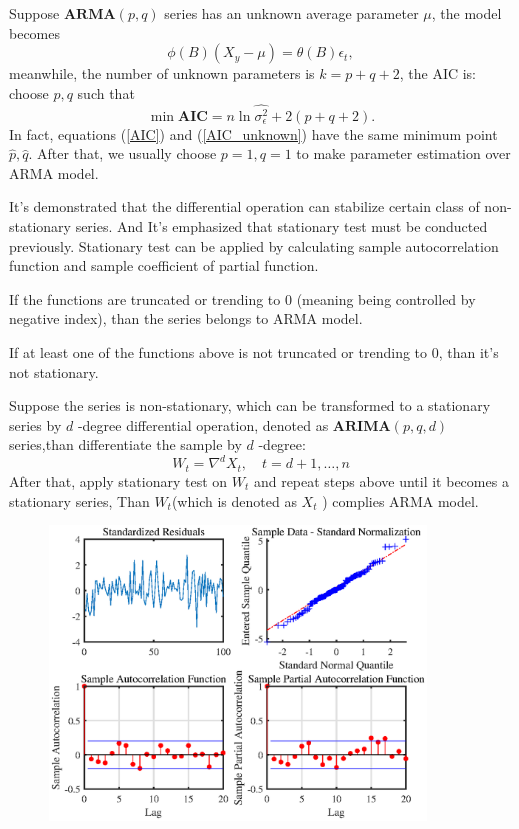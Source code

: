 \documentclass{mcmthesis}
\numberwithin{figure}{section}
\numberwithin{table}{section}
\numberwithin{equation}{section}
\begin{document}
\par
Suppose $ \mathbf{ARMA}(p,q) $ series has an unknown average parameter $ \mu $,
the model becomes
$$
  \phi(B)(X_y-\mu) = \theta(B)\epsilon_t,
$$   
meanwhile, the number of unknown parameters is $ k = p+q+2 $, the AIC is:
choose $ p,q $ such that
\begin{equation}\label{AIC_unknown}
  \min \mathbf{AIC} = n\ln\hat{\sigma_\epsilon^2}+2(p+q+2).
\end{equation}  
In fact, equations (\ref{AIC}) and (\ref{AIC_unknown}) have the same minimum point $ \hat{p},\hat{q} $.
After that, we usually choose $ p = 1, q = 1 $ to make parameter estimation 
over ARMA model.
\par
It's demonstrated that the differential operation can stabilize 
certain class of non-stationary series. And It's emphasized that 
stationary test must be conducted previously. Stationary test can 
be applied by calculating sample autocorrelation function and 
sample coefficient of partial function. 
\par
If the functions are truncated or trending to 0 (meaning being controlled
by negative index), than the series belongs to ARMA model.
\par
If at least one of the functions above is not truncated or trending to 0, than
it's not stationary.
\par
Suppose the series is non-stationary, which can be transformed to 
a stationary series by $ d $ -degree differential operation, denoted
as $ \mathbf{ARIMA}(p,q,d) $ series,than differentiate the sample by
$ d $ -degree:
$$
  W_t = \nabla^dX_t,\quad t = d+1,\dots , n
$$ 
After that, apply stationary test on $ W_t $ and repeat steps above 
until it becomes a stationary series, Than $ W_t $(which is denoted
as $ X_t $ ) complies ARMA model. 
\par

\begin{figure}
  \centering
  \includegraphics[width = 10cm]{code&pic/ARIMA残差&自相关互相关系数.eps}
\end{figure}
\end{document}

